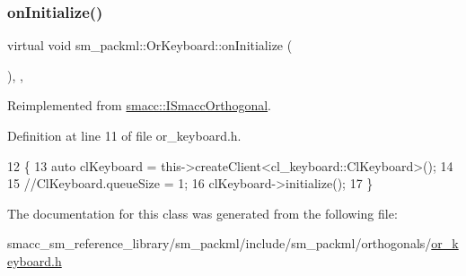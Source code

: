 \subsubsection{\texorpdfstring{on\+Initialize()}{onInitialize()}}
{\footnotesize\ttfamily virtual void sm\+\_\+packml\+::\+Or\+Keyboard\+::on\+Initialize (\begin{DoxyParamCaption}{ }\end{DoxyParamCaption})\hspace{0.3cm}{\ttfamily [inline]}, {\ttfamily [override]}, {\ttfamily [virtual]}}



Reimplemented from \hyperlink{classsmacc_1_1ISmaccOrthogonal_a6bb31c620cb64dd7b8417f8705c79c7a}{smacc\+::\+I\+Smacc\+Orthogonal}.



Definition at line 11 of file or\+\_\+keyboard.\+h.


\begin{DoxyCode}
12     \{
13         \textcolor{keyword}{auto} clKeyboard = this->createClient<cl\_keyboard::ClKeyboard>();
14         
15         \textcolor{comment}{//ClKeyboard.queueSize = 1;}
16         clKeyboard->initialize();
17     \}
\end{DoxyCode}


The documentation for this class was generated from the following file\+:\begin{DoxyCompactItemize}
\item 
smacc\+\_\+sm\+\_\+reference\+\_\+library/sm\+\_\+packml/include/sm\+\_\+packml/orthogonals/\hyperlink{sm__packml_2include_2sm__packml_2orthogonals_2or__keyboard_8h}{or\+\_\+keyboard.\+h}\end{DoxyCompactItemize}
